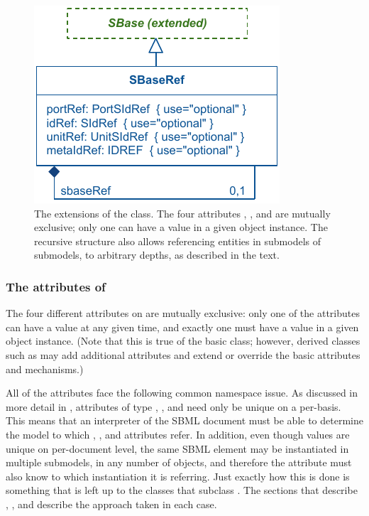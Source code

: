 \begin{figure}[hbt]
  \includegraphics{figs/sbaseref-uml}
  \caption{The extensions of the \SBaseRef class.  The four attributes
    , ,  and 
    are mutually exclusive; only one can have a value in a given object
    instance.  The recursive structure also allows referencing entities
    in submodels of submodels, to arbitrary depths, as described in the
    text.}
  \label{sbaseref-uml}
\end{figure}


\subsubsection{The attributes of }

The four different attributes on \SBaseRef are mutually exclusive: only
one of the attributes can have a value at any given time, and exactly
one must have a value in a given \SBaseRef object instance.  (Note that
this is true of the basic \SBaseRef class; however, derived classes such
as \ReplacedElement may add additional attributes and extend or override
the basic attributes and mechanisms.)

All of the attributes face the following common namespace issue.  As
discussed in more detail in , attributes of type
, , and  need only be
unique on a per-\Model basis.  This means that an interpreter of the
SBML document must be able to determine the model to which
, , and  attributes refer.
In addition, even though  values are unique on per-document
level, the same SBML element may be instantiated in multiple submodels,
in any number of \Model objects, and therefore the 
attribute must also know to which \Model instantiation it is referring.
Just exactly how this is done is something that is left up to the
classes that subclass \SBaseRef.  The sections that describe \Port,
\Deletion, \ReplacedElement and \ReplacedBy describe the approach taken
in each case.

